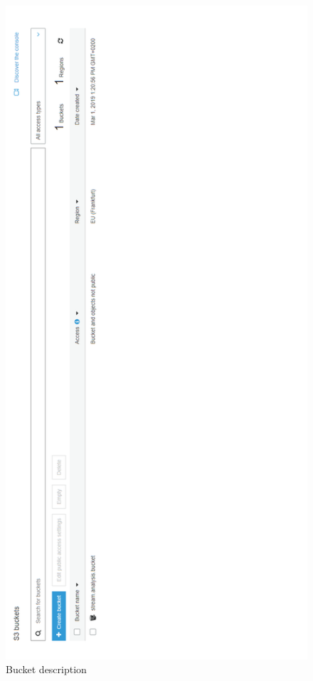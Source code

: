 \begin{figure}[p]
	\centering
	\noindent
	\includegraphics[width=0.5\paperwidth]{./images/aws_resources/S3.PNG}
	\caption{Bucket description}
	\label{fig:s3}
\end{figure}

